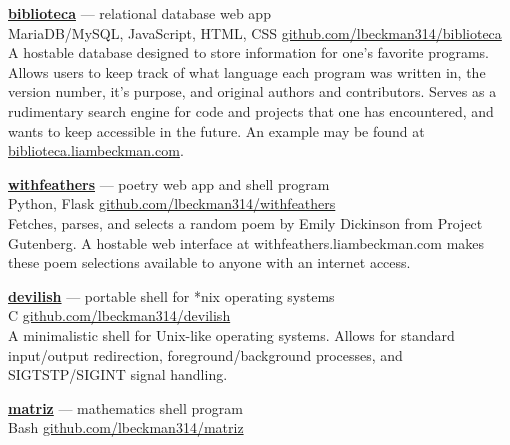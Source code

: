 \documentclass[a4paper]{article}
\begin{document}
\textcolor{my-grey}{\dotfill}
\medbreak

\textcolor{my-blue}{\textbf{\href{https://biblioteca.liambeckman.com}{biblioteca}}} --- relational database web app\\
\textcolor{my-grey}{MariaDB/MySQL, JavaScript, HTML, CSS \hfill \href{https://github.com/lbeckman314/biblioteca}{github.com/lbeckman314/biblioteca}}\\

A hostable database designed to store information for one's favorite programs. Allows users to keep track of what language each program was written in, the version number, it’s purpose, and original authors and contributors. Serves as a rudimentary search engine for code and projects that one has encountered, and wants to keep accessible in the future. An example may be found at \textcolor{my-blue}{\href{https://biblioteca.liambeckman.com}{biblioteca.liambeckman.com}}.

\textcolor{my-grey}{\dotfill}
\medbreak

\textcolor{my-blue}{\textbf{\href{https://withfeathers.liambeckman.com}{withfeathers}}} --- poetry web app and shell program\\
\textcolor{my-grey}{Python, Flask \hfill \href{https://github.com/lbeckman314/withfeathers}{github.com/lbeckman314/withfeathers}}\\

Fetches, parses, and selects a random poem by Emily Dickinson from Project Gutenberg. A hostable web interface at withfeathers.liambeckman.com makes these poem selections available to anyone with an internet access.

\textcolor{my-grey}{\dotfill}
\medbreak

\textcolor{my-blue}{\textbf{\href{https://liambeckman.com/code/devilish}{devilish}}} --- portable shell for *nix operating systems\\
\textcolor{my-grey}{C \hfill \href{https://github.com/lbeckman314/devilish}{github.com/lbeckman314/devilish}}\\

A minimalistic shell for Unix-like operating systems. Allows for standard input/output redirection, foreground/background processes, and SIGTSTP/SIGINT signal handling.

\textcolor{my-grey}{\dotfill}
\medbreak

\textcolor{my-blue}{\textbf{\href{https://liambeckman.com/code/matriz}{matriz}}} --- mathematics shell program\\
\textcolor{my-grey}{Bash \hfill \href{https://github.com/lbeckman314/matriz}{github.com/lbeckman314/matriz}}\\
\end{document}
